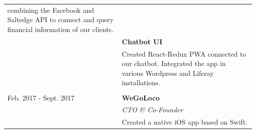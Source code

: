 \documentclass[11pt]{article}
\begin{document}
\begin{tabularx}{\textwidth}{lX}
                           combining the Facebook and Saltedge API to connect
                           and query financial information of our clients. \\[1.5mm]
                         & \textbf{Chatbot UI} \\
                         & Created React-Redux PWA connected to our chatbot.
                           Integrated the app in various Wordpress and Liferay
                           installations. \\\\
  Feb. 2017 - Sept. 2017 & \textbf{WeGoLoco} \\
                         & \textit{CTO \& Co-Founder} \\[1mm]
                         & Created a native iOS app based on Swift. \\

  
  
  
  
  
  

\end{tabularx}
\end{document}
